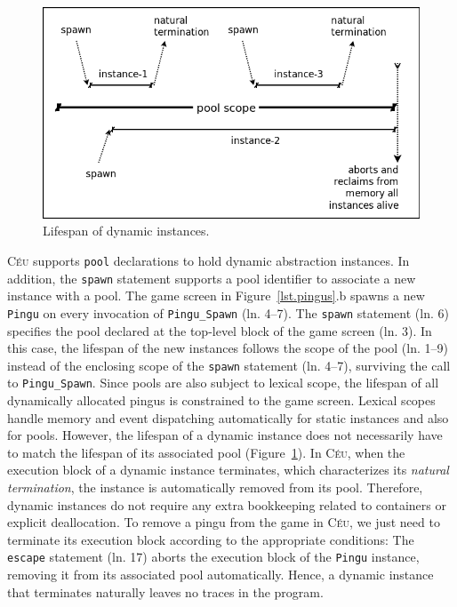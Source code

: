 \documentclass{vgtc}                          %
\newcommand{\CEU}{\textsc{C\'{e}u}\xspace}
\newcommand{\code}[1] {{\small{\texttt{#1}}}}
\begin{document}
\begin{figure}[t]
\centering
\includegraphics[width=\columnwidth]{pool}
\caption{Lifespan of dynamic instances.
\label{fig.pool}
}
\end{figure}

\CEU supports \code{pool} declarations to hold dynamic abstraction instances.
In addition, the \code{spawn} statement supports a pool identifier to associate
a new instance with a pool.
%
The game screen in Figure~\ref{lst.pingus}.b spawns a new \code{Pingu} on every
invocation of \code{Pingu\_Spawn} (ln. 4--7).
%
The \code{spawn} statement (ln. 6) specifies the pool declared at the top-level
block of the game screen (ln. 3).
In this case, the lifespan of the new instances follows the scope of the pool
(ln. 1--9) instead of the enclosing scope of the \code{spawn} statement
(ln. 4--7), surviving the call to \code{Pingu\_Spawn}.
Since pools are also subject to lexical scope, the lifespan of all dynamically
allocated pingus is constrained to the game screen.
%
Lexical scopes handle memory and event dispatching automatically for static
instances and also for pools.
However, the lifespan of a dynamic instance does not necessarily have to match
the lifespan of its associated pool (Figure~\ref{fig.pool}).
In \CEU, when the execution block of a dynamic instance terminates, which
characterizes its \emph{natural termination}, the instance is automatically
removed from its pool.
Therefore, dynamic instances do not require any extra bookkeeping related to 
containers or explicit deallocation.
%
To remove a pingu from the game in \CEU, we just need to terminate its execution
block according to the appropriate conditions:
%
The \code{escape} statement (ln. 17) aborts the execution block of the
\code{Pingu} instance, removing it from its associated pool automatically.
Hence, a dynamic instance that terminates naturally leaves no traces in the 
program.
\end{document}
